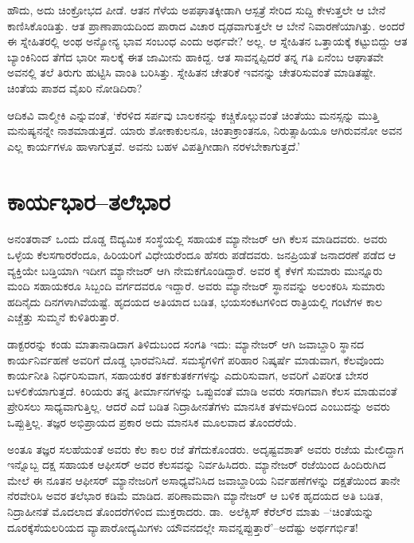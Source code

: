 ಹೌದು, ಅದು ಚಿಂಕ್ರೋಭದ ಪೀಡೆ. ಆತನ ಗೆಳೆಯ ಅಪಘಾತಕ್ಕೀಡಾಗಿ ಆಸ್ಪತ್ರೆ ಸೇರಿದ ಸುದ್ದಿ ಕೇಳುತ್ತಲೇ ಆ ಬೇನೆ ಕಾಣಿಸಿಕೊಂಡಿತ್ತು. ಆತ ಪ್ರಾಣಾಪಾಯದಿಂದ ಪಾರಾದ ವಿಚಾರ ದೃಢವಾಗುತ್ತಲೇ ಆ ಬೇನೆ ನಿವಾರಣೆಯಾಗಿತ್ತು. ಅಂದರೆ ಈ ಸ್ನೇಹಿತರಲ್ಲಿ ಅಂಥ ಅನ್ಯೋನ್ಯ ಭಾವ ಸಂಬಂಧ ಎಂದು ಅರ್ಥವೇ? ಅಲ್ಲ. ಆ ಸ್ನೇಹಿತನ ಒತ್ತಾಯಕ್ಕೆ ಕಟ್ಟುಬಿದ್ದು ಆತ ಬ್ಯಾಂಕಿನಿಂದ ತೆಗೆದ ಭಾರೀ ಸಾಲಕ್ಕೆ ಈತ ಜಾಮೀನು ಹಾಕಿದ್ದ. ಆತ ಸಾವನ್ನಪ್ಪಿದರೆ ತನ್ನ ಗತಿ ಏನೆಂಬ ಆಘಾತವೇ ಅವನಲ್ಲಿ ತಲೆ ತಿರುಗು ಹುಟ್ಟಿಸಿ ವಾಂತಿ ಬರಿಸಿತ್ತು. ಸ್ನೇಹಿತನ ಚೇತರಿಕೆ ಇವನನ್ನು ಚೇತರಿಸುವಂತೆ ಮಾಡಿತಷ್ಟೇ. ಚಿಂತೆಯ ಪಾಶದ ವೈಖರಿ ನೋಡಿದಿರಾ?

ಆದಿಕವಿ ವಾಲ್ಮೀಕಿ ಎನ್ನುವಂತೆ, ‘ಕೆರಳಿದ ಸರ್ಪವು ಬಾಲಕನನ್ನು ಕಚ್ಚಿಕೊಲ್ಲುವಂತೆ ಚಿಂತೆಯು ಮನಸ್ಸನ್ನು ಮುತ್ತಿ ಮನುಷ್ಯನನ್ನೇ ನಾಶಮಾಡುತ್ತದೆ. ಯಾರು ಶೋಕಾಕುಲನೂ, ಚಿಂತಾ\-ಕ್ರಾಂತನೂ, ನಿರುತ್ಸಾಹಿಯೂ ಆಗಿರುವನೋ ಅವನ ಎಲ್ಲ ಕಾರ್ಯಗಳೂ ಹಾಳಾಗುತ್ತವೆ. ಅವನು ಬಹಳ ವಿಪತ್ತಿಗೀಡಾಗಿ ನರಳಬೇಕಾಗುತ್ತದೆ.’


\section*{ಕಾರ್ಯಭಾರ–ತಲೆಭಾರ}


ಅನಂತರಾವ್ ಒಂದು ದೊಡ್ಡ ಔದ್ಯಮಿಕ ಸಂಸ್ಥೆಯಲ್ಲಿ ಸಹಾಯಕ ಮ್ಯಾನೇಜರ್ ಆಗಿ ಕೆಲಸ ಮಾಡಿದವರು. ಅವರು ಒಳ್ಳೆಯ ಕೆಲಸಗಾರರೆಂದೂ, ಹಿರಿಯರಿಗೆ ವಿಧೇಯರೆಂದೂ ಹೆಸರು ಪಡೆದವರು. ಜನಪ್ರಿಯತೆ ಜನಾದರಣೆ ಪಡೆದ ಆ ವ್ಯಕ್ತಿಯೇ ಬಡ್ತಿಯಾಗಿ ಇದೀಗ ಮ್ಯಾನೇಜರ್ ಆಗಿ ನೇಮಕಗೊಂಡಿದ್ದಾರೆ. ಅವರ ಕೈ ಕೆಳಗೆ ಸುಮಾರು ಮುನ್ನೂರು ಮಂದಿ ಸಹಾಯಕರೂ ಸಿಬ್ಬಂದಿ ವರ್ಗದವರೂ ಇದ್ದಾರೆ. ಅವರು ಮ್ಯಾನೇಜರ್ ಸ್ಥಾನವನ್ನು ಅಲಂಕರಿಸಿ ಸುಮಾರು ಹದಿನೈದು ದಿನಗಳಾಗಿವೆಯಷ್ಟೆ. ಹೃದಯದ ಅತಿಯಾದ ಬಡಿತ, ಭಯಸಂಕಟಗಳಿಂದ ರಾತ್ರಿಯಲ್ಲಿ ಗಂಟೆಗಳ ಕಾಲ ಎಚ್ಚೆತ್ತು ಸುಮ್ಮನೆ ಕುಳಿತಿರುತ್ತಾರೆ.

ಡಾಕ್ಟರರನ್ನು ಕಂಡು ಮಾತಾನಾಡಿದಾಗ ತಿಳಿದುಬಂದ ಸಂಗತಿ ಇದು: ಮ್ಯಾನೇಜರ್ ಆಗಿ ಜವಾಬ್ದಾರಿ ಸ್ಥಾನದ ಕಾರ್ಯನಿರ್ವಹಣೆ ಅವರಿಗೆ ದೊಡ್ಡ ಭಾರವೆನಿಸಿದೆ. ಸಮಸ್ಯೆಗಳಿಗೆ ಪರಿಹಾರ ನಿಷ್ಕರ್ಷೆ ಮಾಡುವಾಗ, ಕೆಲವೊಂದು ಕಾರ್ಯನೀತಿ ನಿರ್ಧರಿಸುವಾಗ, ಸಹಾಯಕರ ತರ್ಕಕುತರ್ಕಗಳನ್ನು ಎದುರಿಸುವಾಗ, ಅವರಿಗೆ ವಿಪರೀತ ಬೇಸರ ಬಳಲಿಕೆಯಾಗುತ್ತದೆ. ಕಿರಿಯರು ತನ್ನ ತೀರ್ಮಾನಗಳನ್ನು ಒಪ್ಪುವಂತೆ ಮಾಡಿ ಅವರು ಸರಾಗವಾಗಿ ಕೆಲಸ ಮಾಡುವಂತೆ ಪ್ರೇರಿಸಲು ಸಾಧ್ಯವಾಗುತ್ತಿಲ್ಲ. ಆದರೆ ಎದೆ ಬಡಿತ ನಿದ್ರಾಹೀನತೆಗಳು ಮಾನಸಿಕ ತಳಮಳದಿಂದ ಎಂಬುದನ್ನು ಅವರು ಒಪ್ಪುತ್ತಿಲ್ಲ. ತಜ್ಞರ ಅಭಿಪ್ರಾಯದ ಪ್ರಕಾರ ಅದು ಮಾನಸಿಕ ಮೂಲವಾದ ತೊಂದರೆಯೆ.

ಅಂತೂ ತಜ್ಞರ ಸಲಹೆಯಂತೆ ಅವರು ಕೆಲ ಕಾಲ ರಜೆ ತೆಗೆದುಕೊಂಡರು. ಅದೃಷ್ಟವಶಾತ್ ಅವರು ರಜೆಯ ಮೇಲಿದ್ದಾಗ ಇನ್ನೊಬ್ಬ ದಕ್ಷ ಸಹಾಯಕ ಆಫೀಸರ್​ ಅವರ ಕೆಲಸವನ್ನು ನಿರ್ವಹಿ\-ಸಿದರು. ಮ್ಯಾನೇಜರ್ ರಜೆಯಿಂದ ಹಿಂದಿರುಗಿದ ಮೇಲೆ ಈ ನೂತನ ಆಫೀಸರ್​ ಮ್ಯಾನೇಜರಿಗೆ ಅಸಾಧ್ಯವೆನಿಸಿದ ಜವಾಬ್ದಾರಿಯ ನಿರ್ವಹಣೆಗಳನ್ನು ದಕ್ಷತೆಯಿಂದ ತಾನೇ ನೆರವೇರಿಸಿ ಅವರ ತಲೆಭಾರ ಕಡಿಮೆ ಮಾಡಿದ. ಪರಿಣಾಮವಾಗಿ ಮ್ಯಾನೇಜರ್ ಆ ಬಳಿಕ ಹೃದಯದ ಅತಿ ಬಡಿತ, ನಿದ್ರಾಹೀನತೆ ಮೊದಲಾದ ತೊಂದರೆಗಳಿಂದ ಮುಕ್ತರಾದರು. ಡಾ.\ ಅಲೆಕ್ಸಿಸ್ ಕೆರೆಲ್​ರ ಮಾತು –‘ಚಿಂತೆಯನ್ನು ದೂರಕ್ಕೆಸೆಯಲರಿಯದ ವ್ಯಾಪಾರೋದ್ಯಮಿಗಳು ಯೌವನದಲ್ಲೇ ಸಾವನ್ನಪ್ಪುತ್ತಾರೆ’–ಅದೆಷ್ಟು ಅರ್ಥಗರ್ಭಿತ!


